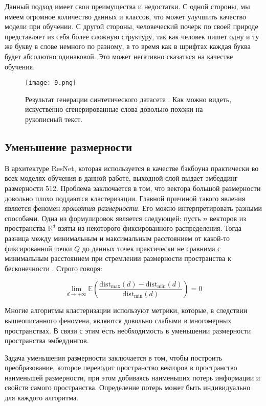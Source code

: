 Данный подход имеет свои преимущества и недостатки. С одной стороны, мы имеем огромное количество данных и классов, что может улучшить качество модели при обучении. С другой стороны, человеческий почерк по своей природе представляет из себя более сложную структуру, так как человек пишет одну и ту же букву в слове немного по разному, в то время как в шрифтах каждая буква будет абсолютно одинаковой. Это может негативно сказаться на качестве обучения.

\begin{figure}[htbp]
    \centering
    \texttt{[image: 9.png]}
    \captionsetup{width=0.9\textwidth}
    \caption{Результат генерации синтетического датасета \cite{font}. Как можно видеть, искуственно сгенерированные слова довольно похожи на рукописный текст.}
    \label{fig:font}
\end{figure}

\subsection{Уменьшение размерности}

В архитектуре ResNet, которая используется в качестве бэкбоуна практически во всех моделях обучения в данной работе, выходной слой выдает эмбеддинг размерности 512. Проблема заключается в том, что вектора большой размерности довольно плохо поддаются кластеризации. Главной причиной такого явления является феномен \textit{проклятия размерности}. Его можно интерпретировать разными способами. Одна из формулировок является следующей: пусть $n$ векторов из пространства $\mathbb{R}^d$ взяты из некоторого фиксированного распределения. Тогда разница между минимальным и максимальным расстоянием от какой-то фиксированной точки $Q$ до данных точек практически не сравнима с минимальным расстоянием при стремлении размерности пространства к бесконечности \cite{bellman1957dynamic}. Строго говоря:

$$
\lim_{d\rightarrow+\infty} \mathbb{E}\left( 
    \frac{\text{dist}_{\text{max}}(d) - \text{dist}_{\text{min}}(d)}{\text{dist}_{\text{min}}(d)}
\right) = 0
$$

\bigskip
Многие алгоритмы кластеризации используют метрики, которые, в следствии вышеописанного феномена, являются довольно слабыми в многомерных пространствах. В связи с этим есть необходимость в уменьшении размерности пространства эмбеддингов.

Задача уменьшения размерности заключается в том, чтобы построить преобразование, которое переводит пространство векторов в пространство наименьшей размерности, при этом добиваясь наименьших потерь информации и свойств самого пространства. Определение потерь может быть индивидуально для каждого алгоритма. 

